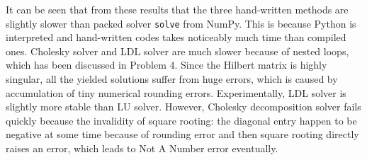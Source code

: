\documentclass[english, nochinese]{pnote}
\begin{document}
It can be seen that from these results that the three hand-written methods are slightly slower than packed solver \verb"solve" from NumPy. This is because Python is interpreted and hand-written codes takes noticeably much time than compiled ones. Cholesky solver and LDL solver are much slower because of nested loops, which has been discussed in Problem 4. Since the Hilbert matrix is highly singular, all the yielded solutions suffer from huge errors, which is caused by accumulation of tiny numerical rounding errors. Experimentally, LDL solver is slightly more stable than LU solver. However, Cholesky decomposition solver fails quickly because the invalidity of square rooting: the diagonal entry happen to be negative at some time because of rounding error and then square rooting directly raises an error, which leads to Not A Number error eventually.
\end{document}
